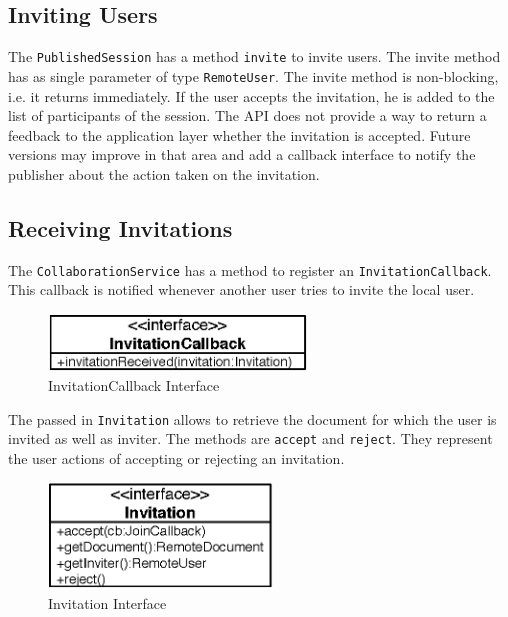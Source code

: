 \subsection{Inviting Users}
\label{sect:archoverview.invitingusers}
The \texttt{Published\-Session} has a method \texttt{invite} to invite users.
The invite method has as single parameter of type \texttt{Remote\-User}. 
The invite method is non-blocking, i.e. it
returns immediately. If the user accepts the invitation, he is added to the
list of participants of the session. The API does not provide a way to return
a feedback to the application layer whether the invitation is accepted.
Future versions may improve in that area and add a callback interface 
to notify the publisher about the action taken on the invitation.


\subsection{Receiving Invitations}
\label{sect:archoverview.invitation}
The \texttt{CollaborationService} has a method to register an
\texttt{InvitationCallback}. This callback is notified whenever another user
tries to invite the local user. 

\begin{figure}[H]
 \centering
 \includegraphics[width=6.84cm,height=1.52cm]{../images/finalreport/architecture_invitationcallback_uml.eps}
 \caption{InvitationCallback Interface}
\end{figure}

The passed in \texttt{Invitation} allows to retrieve the document for which
the user is invited as well as inviter. The
methods are \texttt{accept} and \texttt{reject}. They represent
the user actions of accepting or rejecting an invitation. 

\begin{figure}[H]
 \centering
 \includegraphics[width=5.96cm,height=2.82cm]{../images/finalreport/architecture_invitation_uml.eps}
 \caption{Invitation Interface}
\end{figure}

